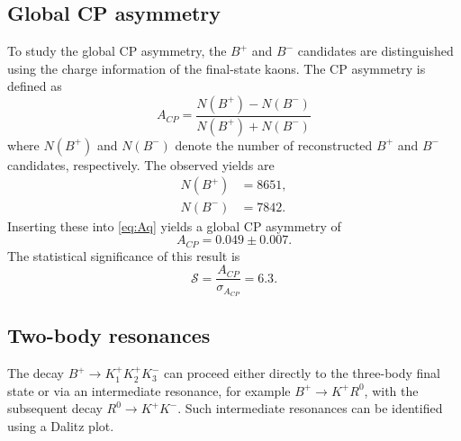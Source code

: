 \subsection{Global CP asymmetry}
\label{sec:Global}
To study the global CP asymmetry,
the $B^{+}$ and $B^{-}$ candidates are distinguished using the charge information of the final-state kaons.
The CP asymmetry is defined as
\begin{equation}
    A_{CP} = \frac{N(B^{+}) - N(B^{-})}{N(B^{+}) + N(B^{-})}
    \label{eq:Aq}
\end{equation}
where $N(B^{+})$ and $N(B^{-})$ denote the number of reconstructed $B^{+}$ and $B^{-}$ candidates, respectively.
The observed yields are
\begin{align}
    N(B^{+}) &=  8651, \\
    N(B^{-}) &=  7842.
\end{align}
Inserting these into \autoref{eq:Aq} yields a global CP asymmetry of
\begin{equation}
    A_{CP} = 0.049 \pm 0.007.
\end{equation}
The statistical significance of this result is
\begin{equation}
    \mathcal{S} = \frac{A_{CP}}{\sigma_{A_{CP}}} = 6.3.
\end{equation}



\subsection{Two-body resonances}
\label{sec:Resonanz}
The decay $B^{+} \rightarrow K^{+}_{1}K^{+}_{2}K^{-}_{3}$ can proceed either directly to the three-body final state or via an intermediate resonance,
for example $B^{+} \rightarrow K^{+}R^{0}$,
with the subsequent decay $R^{0} \rightarrow K^{+}K^{-}$.
Such intermediate resonances can be identified using a Dalitz plot.

